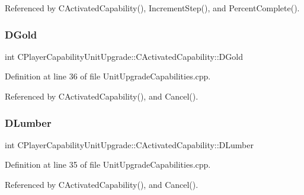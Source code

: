 Referenced by C\+Activated\+Capability(), Increment\+Step(), and Percent\+Complete().

\hypertarget{classCPlayerCapabilityUnitUpgrade_1_1CActivatedCapability_a259a99f41ef918edf79f6827dec06559}{}\label{classCPlayerCapabilityUnitUpgrade_1_1CActivatedCapability_a259a99f41ef918edf79f6827dec06559} 
\subsubsection{\texorpdfstring{D\+Gold}{DGold}}
{\footnotesize\ttfamily int C\+Player\+Capability\+Unit\+Upgrade\+::\+C\+Activated\+Capability\+::\+D\+Gold\hspace{0.3cm}{\ttfamily [protected]}}



Definition at line 36 of file Unit\+Upgrade\+Capabilities.\+cpp.



Referenced by C\+Activated\+Capability(), and Cancel().

\hypertarget{classCPlayerCapabilityUnitUpgrade_1_1CActivatedCapability_aa4de5f57ea9d8dd85d7e6f62015c4a8d}{}\label{classCPlayerCapabilityUnitUpgrade_1_1CActivatedCapability_aa4de5f57ea9d8dd85d7e6f62015c4a8d} 
\subsubsection{\texorpdfstring{D\+Lumber}{DLumber}}
{\footnotesize\ttfamily int C\+Player\+Capability\+Unit\+Upgrade\+::\+C\+Activated\+Capability\+::\+D\+Lumber\hspace{0.3cm}{\ttfamily [protected]}}



Definition at line 35 of file Unit\+Upgrade\+Capabilities.\+cpp.



Referenced by C\+Activated\+Capability(), and Cancel().

